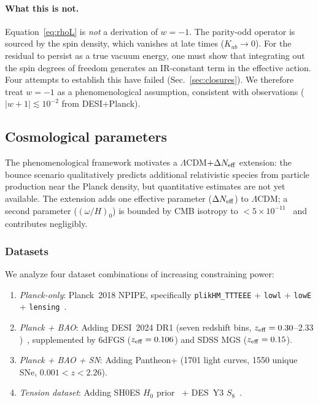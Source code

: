 \documentclass[aps,prd,twocolumn,superscriptaddress,showpacs,preprintnumbers,
  nofootinbib,longbibliography,floatfix]{revtex4-2}
\newcommand{\Neff}{N_{\rm eff}}
\begin{document}
\paragraph{What this is not.}
Equation~\eqref{eq:rhoL} is \textit{not} a derivation of $w = -1$.
The parity-odd operator is sourced by the spin density, which vanishes
at late times ($K_{ab} \to 0$). For the residual to persist as a true
vacuum energy, one must show that integrating out the spin degrees of
freedom generates an IR-constant term in the effective action. Four
attempts to establish this have failed (Sec.~\ref{sec:closures}). We
therefore treat $w = -1$ as a phenomenological assumption, consistent
with observations ($|w+1| \lesssim 10^{-2}$ from DESI+Planck).

\subsection{Cosmological parameters}\label{sec:cosmo}

The phenomenological framework motivates a $\Lambda$CDM$+\Delta\Neff$
extension: the bounce scenario qualitatively predicts additional
relativistic species from particle production near the Planck density,
but quantitative estimates are not yet available. The extension adds
one effective parameter ($\Delta\Neff$) to $\Lambda$CDM; a second
parameter ($(\omega/H)_0$) is bounded by CMB isotropy to
$< 5\times 10^{-11}$~\cite{Saadeh2016} and contributes negligibly.

\subsubsection{Datasets}

We analyze four dataset combinations of increasing constraining power:
\begin{enumerate}[leftmargin=*]
\item \textit{Planck-only}: Planck~2018 NPIPE, specifically
  \texttt{plikHM\_TTTEEE} + \texttt{lowl} + \texttt{lowE} +
  \texttt{lensing}~\cite{Planck2018params}.
\item \textit{Planck + BAO}: Adding DESI~2024 DR1 (seven redshift bins,
  $z_{\rm eff} = 0.30$--$2.33$)~\cite{DESI2024}, supplemented by 6dFGS
  ($z_{\rm eff}=0.106$) and SDSS MGS ($z_{\rm eff}=0.15$).
\item \textit{Planck + BAO + SN}: Adding Pantheon+ (1701 light curves,
  1550 unique SNe, $0.001 < z < 2.26$).
\item \textit{Tension dataset}: Adding SH0ES $H_0$
  prior~\cite{Riess2022} + DES~Y3 $S_8$~\cite{DES2024}.
\end{enumerate}
\end{document}
